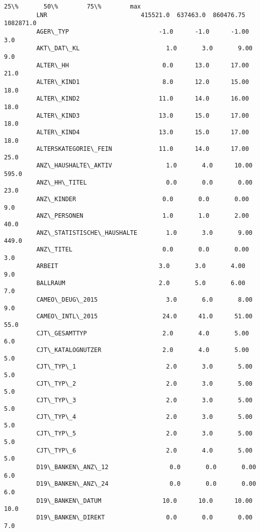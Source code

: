 \documentclass[11pt]{article}
\begin{document}
\begin{Verbatim}[commandchars=\\\{\}]
                                           25\%       50\%        75\%        max  
         LNR                          415521.0  637463.0  860476.75  1082871.0  
         AGER\_TYP                         -1.0      -1.0      -1.00        3.0  
         AKT\_DAT\_KL                        1.0       3.0       9.00        9.0  
         ALTER\_HH                          0.0      13.0      17.00       21.0  
         ALTER\_KIND1                       8.0      12.0      15.00       18.0  
         ALTER\_KIND2                      11.0      14.0      16.00       18.0  
         ALTER\_KIND3                      13.0      15.0      17.00       18.0  
         ALTER\_KIND4                      13.0      15.0      17.00       18.0  
         ALTERSKATEGORIE\_FEIN             11.0      14.0      17.00       25.0  
         ANZ\_HAUSHALTE\_AKTIV               1.0       4.0      10.00      595.0  
         ANZ\_HH\_TITEL                      0.0       0.0       0.00       23.0  
         ANZ\_KINDER                        0.0       0.0       0.00        9.0  
         ANZ\_PERSONEN                      1.0       1.0       2.00       40.0  
         ANZ\_STATISTISCHE\_HAUSHALTE        1.0       3.0       9.00      449.0  
         ANZ\_TITEL                         0.0       0.0       0.00        3.0  
         ARBEIT                            3.0       3.0       4.00        9.0  
         BALLRAUM                          2.0       5.0       6.00        7.0  
         CAMEO\_DEUG\_2015                   3.0       6.0       8.00        9.0  
         CAMEO\_INTL\_2015                  24.0      41.0      51.00       55.0  
         CJT\_GESAMTTYP                     2.0       4.0       5.00        6.0  
         CJT\_KATALOGNUTZER                 2.0       4.0       5.00        5.0  
         CJT\_TYP\_1                         2.0       3.0       5.00        5.0  
         CJT\_TYP\_2                         2.0       3.0       5.00        5.0  
         CJT\_TYP\_3                         2.0       3.0       5.00        5.0  
         CJT\_TYP\_4                         2.0       3.0       5.00        5.0  
         CJT\_TYP\_5                         2.0       3.0       5.00        5.0  
         CJT\_TYP\_6                         2.0       4.0       5.00        5.0  
         D19\_BANKEN\_ANZ\_12                 0.0       0.0       0.00        6.0  
         D19\_BANKEN\_ANZ\_24                 0.0       0.0       0.00        6.0  
         D19\_BANKEN\_DATUM                 10.0      10.0      10.00       10.0  
         D19\_BANKEN\_DIREKT                 0.0       0.0       0.00        7.0  

\end{Verbatim}
\end{document}

